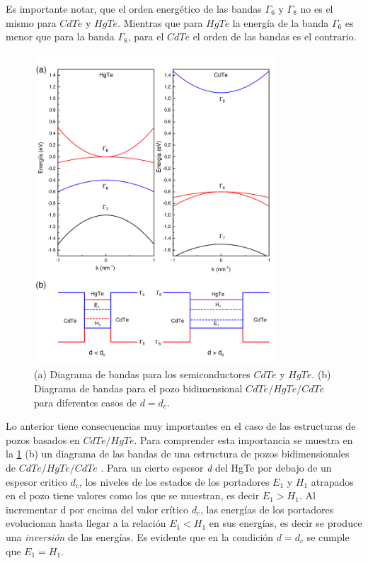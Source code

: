 Es importante notar, que el orden energético de las bandas  $ \Gamma_{6} $ y $ \Gamma_{8} $ no es el mismo para $ CdTe $ y 
$ HgTe $. Mientras que para $ HgTe $ la energía de la banda $ \Gamma_{6} $  es menor que para la banda  $ \Gamma_{8} $, para el 
$ CdTe $ el orden de las bandas es el contrario.

\begin{figure}[h!]
    \centering
    \includegraphics[width=0.8\textwidth]{figures/chap3/band_diagram.pdf}
        \caption{(a) Diagrama de bandas para los semiconductores $ CdTe $ y $ HgTe $. (b) Diagrama de bandas para el pozo
        bidimensional $ CdTe/HgTe/CdTe $ para diferentes casos de $ d = d_{c} $.}
    \label{fig:band_diagram}
\end{figure}

Lo anterior tiene consecuencias muy importantes en el caso de las estructuras de pozos basados en $ CdTe/HgTe $. Para 
comprender esta importancia se muestra en la \ref{fig:band_diagram} (b) un diagrama de las bandas de una estructura de pozos 
bidimensionales de $ CdTe/HgTe/CdTe $ \cite{Bernevig2006}. 
Para un cierto espesor \textit{d} del HgTe por debajo de un espesor critico $ d_{c} $, los niveles de los estados de los 
portadores $ E_{1} $ y $ H_{1} $ atrapados en el pozo tiene valores como los que se muestran, es decir $ E_{1}>H_{1} $. 
Al incrementar d por encima del valor crítico $ d_{c} $, las energías de los portadores evolucionan hasta llegar a la relación 
$ E_{1}<H_{1} $ en sus energías, es decir se produce una \textit{inversión} de las energías. Es evidente que 
en la condición $ d = d_{c} $ se cumple que $ E_{1} = H_{1} $. 

